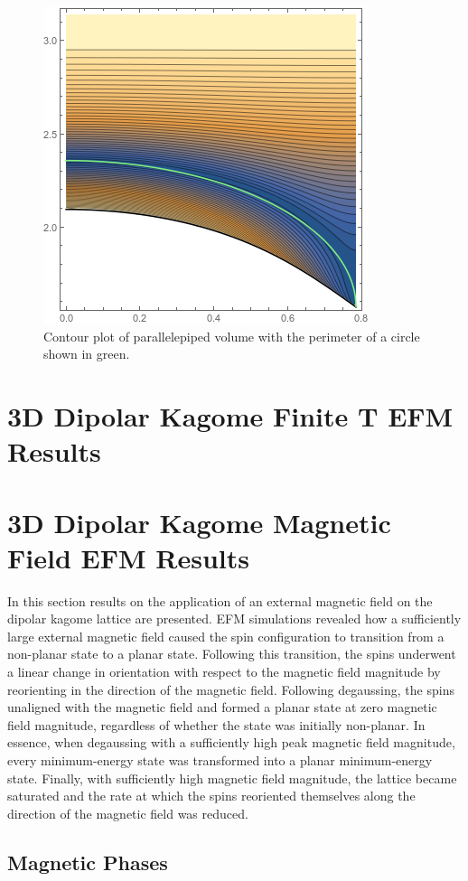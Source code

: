 \begin{figure}[h]
\centering
\includegraphics[width=.5\linewidth]{img/groundstatevol_withplanarborder.png} 
    \caption{Contour plot of parallelepiped volume with the perimeter of a circle shown in green.} 
\end{figure}
\clearpage
\section{3D Dipolar Kagome Finite T EFM Results}


\section{3D Dipolar Kagome Magnetic Field EFM Results}

In this section results on the application of an external magnetic field on the dipolar kagome lattice are presented. EFM simulations revealed how a sufficiently large external magnetic field caused the spin configuration to transition from a non-planar state to a planar state. Following this transition, the spins underwent a linear change in orientation with respect to the magnetic field magnitude by reorienting in the direction of the magnetic field. Following degaussing, the spins unaligned with the magnetic field and formed a planar state at zero magnetic field magnitude, regardless of whether the state was initially non-planar. In essence, when degaussing with a sufficiently high peak magnetic field magnitude, every minimum-energy state was transformed into a planar minimum-energy state. Finally, with sufficiently high magnetic field magnitude, the lattice became saturated and the rate at which the spins reoriented themselves along the direction of the magnetic field was reduced. 

\subsection{Magnetic Phases}

